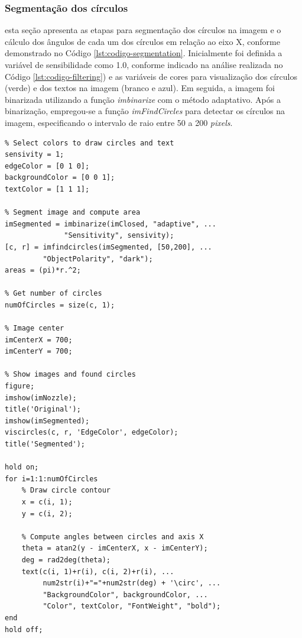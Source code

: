 \documentclass[conference]{IEEEtran}
\begin{document}
\subsubsection{Segmentação dos círculos} esta seção apresenta as etapas para segmentação dos círculos na imagem e o cálculo dos ângulos de cada um dos círculos em relação ao eixo X, conforme demonstrado no Código \ref{lst:codigo-segmentation}. Inicialmente foi definida a variável de sensibilidade como 1.0, conforme indicado na análise realizada no Código \ref{lst:codigo-filtering}) e as variáveis de cores para visualização dos círculos (verde) e dos textos na imagem (branco e azul). Em seguida, a imagem foi binarizada utilizando a função \textit{imbinarize} com o método adaptativo. Após a binarização, empregou-se a função \textit{imFindCircles} para detectar os círculos na imagem, especificando o intervalo de raio entre 50 a 200 \textit{pixels}.


\begin{lstlisting}[caption={Segmentação dos círculos e cálculo dos ângulos}, label={lst:codigo-segmentation}]
% Select sensivity to segmentation 
% Select colors to draw circles and text
sensivity = 1;
edgeColor = [0 1 0];
backgroundColor = [0 0 1];
textColor = [1 1 1];

% Segment image and compute area
imSegmented = imbinarize(imClosed, "adaptive", ...
		      "Sensitivity", sensivity); 
[c, r] = imfindcircles(imSegmented, [50,200], ...
  	  	 "ObjectPolarity", "dark");
areas = (pi)*r.^2;

% Get number of circles
numOfCircles = size(c, 1);

% Image center
imCenterX = 700;
imCenterY = 700;

% Show images and found circles
figure;
imshow(imNozzle);
title('Original');
imshow(imSegmented); 
viscircles(c, r, 'EdgeColor', edgeColor);
title('Segmented');

hold on;
for i=1:1:numOfCircles
	% Draw circle contour
	x = c(i, 1);
	y = c(i, 2);
	
	% Compute angles between circles and axis X 
	theta = atan2(y - imCenterX, x - imCenterY);
	deg = rad2deg(theta);
	text(c(i, 1)+r(i), c(i, 2)+r(i), ...
		 num2str(i)+"="+num2str(deg) + '\circ', ...
		 "BackgroundColor", backgroundColor, ...
		 "Color", textColor, "FontWeight", "bold");
end
hold off;
\end{lstlisting}

\end{document}
